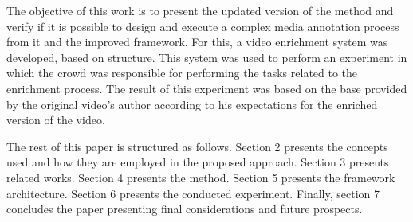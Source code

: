 The objective of this work is to present the updated version of the method and verify if it is possible to design and execute a complex media annotation process from it and the improved framework. For this, a video enrichment system was developed, based on structure. This system was used to perform an experiment in which the crowd was responsible for performing the tasks related to the enrichment process. The result of this experiment was based on the base provided by the original video's author according to his expectations for the enriched version of the video.


The rest of this paper is structured as follows. Section 2 presents the concepts used and how they are employed in the proposed approach. Section 3 presents related works. Section 4 presents the method. Section 5 presents the framework architecture. Section 6 presents the conducted experiment. Finally, section 7 concludes the paper presenting final considerations and future prospects.
